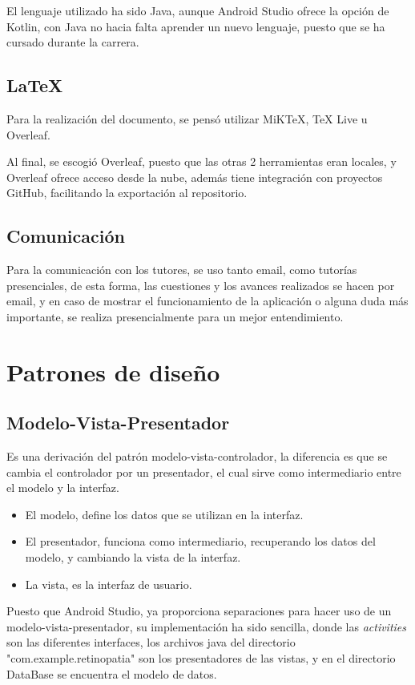         El lenguaje utilizado ha sido Java, aunque Android Studio ofrece la opción de Kotlin, con Java no hacia falta aprender un nuevo lenguaje, puesto que se ha cursado durante la carrera.

    \subsection{LaTeX}
        Para la realización del documento, se pensó utilizar MiKTeX, TeX Live u Overleaf.
    
        Al final, se escogió Overleaf, puesto que las otras 2 herramientas eran locales, y Overleaf ofrece acceso desde la nube, además tiene integración con proyectos GitHub, facilitando la exportación al repositorio.


    \subsection{Comunicación}
        Para la comunicación con los tutores, se uso tanto email, como tutorías presenciales, de esta forma, las cuestiones y los avances realizados se hacen por email, y en caso de mostrar el funcionamiento de la aplicación o alguna duda más importante, se realiza presencialmente para un mejor entendimiento.

\section{Patrones de diseño}
    \subsection{Modelo-Vista-Presentador}
        Es una derivación del patrón modelo-vista-controlador, la diferencia es que se cambia el controlador por un presentador, el cual sirve como intermediario entre el modelo y la interfaz.
        \begin{itemize}
            \item El modelo, define los datos que se utilizan en la interfaz.
            \item El presentador, funciona como intermediario, recuperando los datos del modelo, y cambiando la vista de la interfaz.
            \item La vista, es la interfaz de usuario.
        \end{itemize}
        Puesto que Android Studio, ya proporciona separaciones para hacer uso de un modelo-vista-presentador, su implementación ha sido sencilla, donde las \textit{activities} son las diferentes interfaces, los archivos java del directorio "com.example.retinopatia" son los presentadores de las vistas, y en el directorio DataBase se encuentra el modelo de datos.

